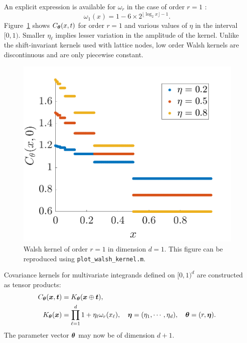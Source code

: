 \documentclass[graybox,footinfo]{svmult}
\newcommand{\JRNote}[1]{{\textcolor{green}{JR: #1}}}
\begin{document}
An explicit expression is available for $\omega_{r}$ in the case of order $r=1$ \cite{Nuyens2013}:
\begin{equation}
\label{FJ:eqn:omega1}
\omega_1(x) 
= 1  - 6 \times 2^{\lfloor \log_2 x \rfloor -1 }.
\end{equation}
Figure~\ref{FJ:fig:walshkernel-dim1} shows $C_{\boldsymbol{\theta}} (x,t)$ for order $r=1$ and various values of $\eta$ in the interval $[0,1)$. Smaller $\eta_\ell$ implies lesser variation in the amplitude of the kernel.  Unlike the shift-invariant kernels used with lattice nodes, low order Walsh kernels are discontinuous and are only piecewise constant. 

\begin{figure}
	\centering
	\includegraphics[width=0.9\linewidth]{"figures/walsh_kernel dim_1"}
	\caption[Walsh kernel]{Walsh kernel of order $r=1$ in dimension $d=1$. This figure can be reproduced using \texttt{plot\_walsh\_kernel.m}. %
	}
	\label{FJ:fig:walshkernel-dim1}
\end{figure}

Covariance kernels for multivariate integrands defined on $[0,1)^d$ are constructed as tensor products:
\begin{align}
\label{FJ:eqn:digital_shift_in_kernel}
C_{\bstheta}(\bsx, \bst) &= K_{\bstheta} (\bsx \oplus \bst), \\
\label{FJ:eqn:walsh_kernel}
K_{\bstheta} (\bsx) & =  
\prod_{\ell=1}^d  1 + \eta_\ell \omega_{r} (x_\ell), \quad \bseta = (\eta_1, \cdots, \eta_d), \quad \bstheta = (r, \bseta).
\end{align}
The parameter vector ${\boldsymbol{\theta}}$ may now be of dimension $d+1$.
\end{document}
